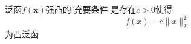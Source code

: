 \documentclass{lzureport}
\begin{document}
	


泛函$f(\boldsymbol{x})$强凸的 \textcolor{YBXPurple}{充要条件} 是存在$c>0$使得
$$f(x)-c\|x\|_2^2$$
为凸泛函
\end{document}
